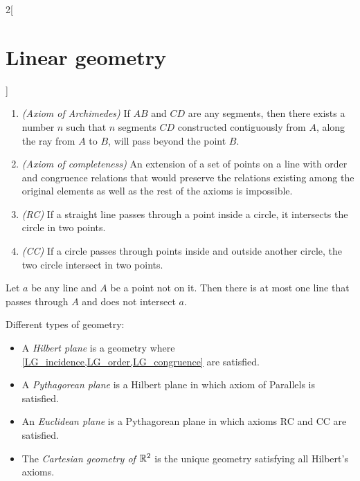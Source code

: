 \documentclass[../../../main.tex]{subfiles}
\begin{document}
\begin{multicols}{2}[\section{Linear geometry}]
\begin{axiom}
\begin{enumerate}
        \end{enumerate}
    \end{axiom}
    \begin{axiom}
        \hfill
        \begin{enumerate}
            \item \textit{(Axiom of Archimedes)} If $AB$ and $CD$ are any segments, then there exists a number $n$ such that $n$ segments $CD$ constructed contiguously from $A$, along the ray from $A$ to $B$, will pass beyond the point $B$.
            \item \textit{(Axiom of completeness)} An extension of a set of points on a line with order and congruence relations that would preserve the relations existing among the original elements as well as the rest of the axioms is impossible.
            \item \textit{(RC)} If a straight line passes through a point inside a circle, it intersects the circle in two points.
            \item \textit{(CC)} If a circle passes through points inside and outside another circle, the two circle intersect in two points.
        \end{enumerate}
    \end{axiom}
    \begin{axiom}
        Let $a$ be any line and $A$ be a point not on it. Then there is at most one line that passes through $A$ and does not intersect $a$.
    \end{axiom}
    \begin{definition}
        Different types of geometry:
        \begin{itemize}
            \item A \textit{Hilbert plane} is a geometry where \cref{LG_incidence,LG_order,LG_congruence} are satisfied.
            \item A \textit{Pythagorean plane} is a Hilbert plane in which axiom of Parallels is satisfied.
            \item An \textit{Euclidean plane} is a Pythagorean plane in which axioms RC and CC are satisfied.
            \item The \textit{Cartesian geometry of $\mathbb{R}^2$} is the unique geometry satisfying all Hilbert's axioms.
        \end{itemize}
    \end{definition}

\end{multicols}
\end{document}
